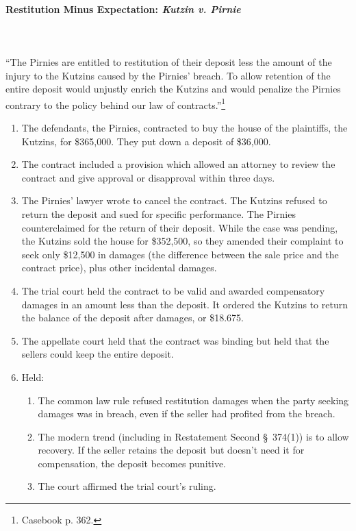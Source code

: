 \paragraph{Restitution Minus Expectation: \emph{Kutzin v. Pirnie}}
~\\\\
``The Pirnies are entitled to restitution of their deposit less the amount of 
the injury to the Kutzins caused by the Pirnies' breach. To allow retention of 
the entire deposit would unjustly enrich the Kutzins and would penalize the 
Pirnies contrary to the policy behind our law of 
contracts.''\footnote{Casebook p. 362.}

\begin{enumerate}
    \item The defendants, the Pirnies, contracted to buy the house of the 
    plaintiffs, the Kutzins, for \$365,000. They put down a deposit of 
    \$36,000.
    \item The contract included a provision which allowed an attorney to 
    review the contract and give approval or disapproval within three days.
    \item The Pirnies' lawyer wrote to cancel the contract. The Kutzins 
    refused to return the deposit and sued for specific performance. The 
    Pirnies counterclaimed for the return of their deposit. While the case 
    was pending, the Kutzins sold the house for \$352,500, so they amended 
    their complaint to seek only \$12,500 in damages (the difference between 
    the sale price and the contract price), plus other incidental damages.
    \item The trial court held the contract to be valid and awarded
    compensatory damages in an amount less than the deposit. It ordered the 
    Kutzins to return the balance of the deposit after damages, or \$18.675.
    \item The appellate court held that the contract was binding but held that 
    the sellers could keep the entire deposit.
    \item Held:
    \begin{enumerate}
        \item The common law rule refused restitution damages when the party 
        seeking damages was in breach, even if the seller had profited from 
        the breach.
        \item The modern trend (including in Restatement Second \S\ 374(1)) is 
        to allow recovery. If the seller retains the deposit but doesn't need 
        it for compensation, the deposit becomes punitive.
        \item The court affirmed the trial court's ruling.
    \end{enumerate}
\end{enumerate}

